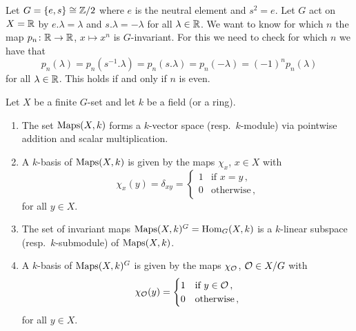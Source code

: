 \begin{example}
  Let $G = \{e,s\} \cong \mathbb{Z}/2$ where $e$ is the neutral element and $s^2 = e$.
  Let $G$ act on $X = \mathbb{R}$ by $e.\lambda = \lambda$ and $s.\lambda = -\lambda$ for all $\lambda \in \mathbb{R}$.
  We want to know for which $n$ the map $p_n \colon \mathbb{R} \to \mathbb{R}$, $x \mapsto x^n$ is $G$-invariant.
  For this we need to check for which $n$ we have that
  \[
      p_n(\lambda)
    = p_n\left( s^{-1}.\lambda \right)
    = p_n(s.\lambda)
    = p_n(-\lambda)
    = (-1)^n p_n(\lambda)
  \]
  for all $\lambda \in \mathbb{R}$.
  This holds if and only if $n$ is even.
\end{example}


\begin{lemma}\label{lemma: basis of Maps and Hom}
  Let $X$ be a finite $G$-set and let $k$ be a field \textup(or a ring\textup).
  \begin{enumerate}[label=\alph*),leftmargin=*]
    \item
      The set $\operatorname{Maps}(X,k)$ forms a $k$-vector space \textup(resp.\ $k$-module\textup) via pointwise addition and scalar multiplication.
    \item
      A $k$-basis of $\operatorname{Maps}(X,k)$ is given by the maps $\chi_x$, $x \in X$ with
      \[
          \chi_x(y)
        = \delta_{xy}
        = \begin{cases}
            1 & \text{if $x = y$} \,, \\
            0 & \text{otherwise}  \,,
          \end{cases}
      \]
      for all $y \in X$.
    \item
      The set of invariant maps $\operatorname{Maps}(X,k)^G = \operatorname{Hom}_G(X,k)$ is a $k$-linear subspace \textup(resp.\ $k$-submodule\textup) of $\operatorname{Maps}(X,k)$.
    \item
      A $k$-basis of $\operatorname{Maps}(X,k)^G$ is given by the maps $\chi_\mathcal{O}$, $\mathcal{O} \in X/G$ with
      \[
          \chi_\mathcal{O}(y)
        = \begin{cases}
            1 & \text{if $y \in \mathcal{O}$} \,,  \\
            0 & \text{otherwise} \,,
          \end{cases}
      \]
      for all $y \in X$.
  \end{enumerate}
\end{lemma}
